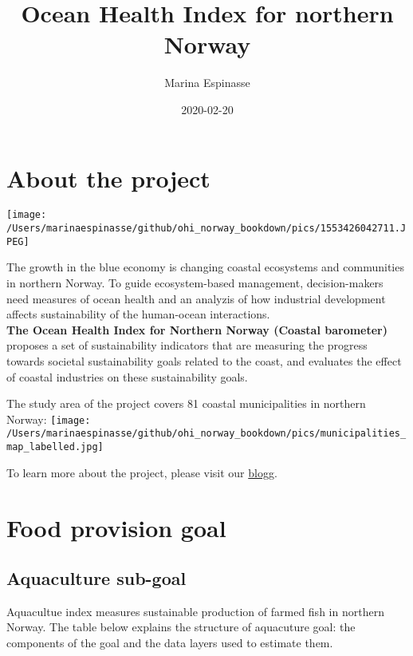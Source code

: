\documentclass[
]{book}
\title{Ocean Health Index for northern Norway}
\author{Marina Espinasse}
\date{2020-02-20}
\begin{document}
\maketitle

{
\setcounter{tocdepth}{1}
\tableofcontents
}
\hypertarget{about-the-project}{%
\chapter{About the project}\label{about-the-project}}

\texttt{[image: /Users/marinaespinasse/github/ohi\_norway\_bookdown/pics/1553426042711.JPEG]}

The growth in the blue economy is changing coastal ecosystems and communities in northern Norway. To guide ecosystem-based management, decision-makers need measures of ocean health and an analyzis of how industrial development affects sustainability of the human-ocean interactions.\\
{\textbf{The Ocean Health Index for Northern Norway (Coastal barometer)}} proposes a set of sustainability indicators that are measuring
the progress towards societal sustainability goals related to the coast, and evaluates the effect of coastal industries on these sustainability goals.

The study area of the project covers 81 coastal municipalities in northern Norway:
\texttt{[image: /Users/marinaespinasse/github/ohi\_norway\_bookdown/pics/municipalities\_map\_labelled.jpg]}

To learn more about the project, please visit our \href{https://markdownmonster.west-wind.com/docs/_4xs10gaui.htm}{blogg}.

\hypertarget{food}{%
\chapter{Food provision goal}\label{food}}

\hypertarget{aquaculture-sub-goal}{%
\section{Aquaculture sub-goal}\label{aquaculture-sub-goal}}

Aquacultue index measures sustainable production of farmed fish in northern Norway.
The table below explains the structure of aquacuture goal: the components of the goal and the data layers used to estimate them.
\end{document}
